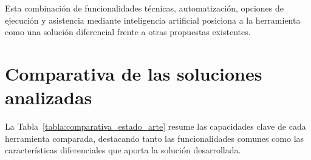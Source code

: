 \begin{parskipenv}
Esta combinación de funcionalidades técnicas, automatización, opciones de ejecución y asistencia mediante inteligencia artificial posiciona a la herramienta como una solución diferencial frente a otras propuestas existentes.

\section{Comparativa de las soluciones analizadas}
La Tabla~\ref{tabla:comparativa_estado_arte} resume las capacidades clave de cada herramienta comparada, destacando tanto las funcionalidades comunes como las características diferenciales que aporta la solución desarrollada.

\begin{table}[H]
\centering
{}
\caption{Comparativa entre la herramienta desarrollada y soluciones similares.}
\label{tabla:comparativa_estado_arte}
\end{table}


\end{parskipenv}
